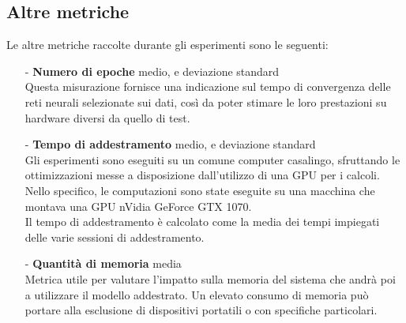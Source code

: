 \subsection{Altre metriche}
Le altre metriche raccolte durante gli esperimenti sono le seguenti:
\begin{itemize}
    \item[-] \textbf{Numero di epoche} medio, e deviazione standard\\
    Questa misurazione fornisce una indicazione sul tempo di convergenza delle reti neurali selezionate sui dati, così da poter stimare le loro prestazioni su hardware diversi da quello di test.
    \item[-] \textbf{Tempo di addestramento} medio, e deviazione standard\\
    Gli esperimenti sono eseguiti su un comune computer casalingo, sfruttando le ottimizzazioni messe a disposizione dall'utilizzo di una GPU per i calcoli. Nello specifico, le computazioni sono state eseguite su una macchina che montava una GPU nVidia GeForce GTX 1070.\\%
    Il tempo di addestramento è calcolato come la media dei tempi impiegati delle varie sessioni di addestramento.
    \item[-] \textbf{Quantità di memoria} media\\
    Metrica utile per valutare l'impatto sulla memoria del sistema che andrà poi a utilizzare il modello addestrato. Un elevato consumo di memoria può portare alla esclusione di dispositivi portatili o con specifiche particolari.
\end{itemize}

